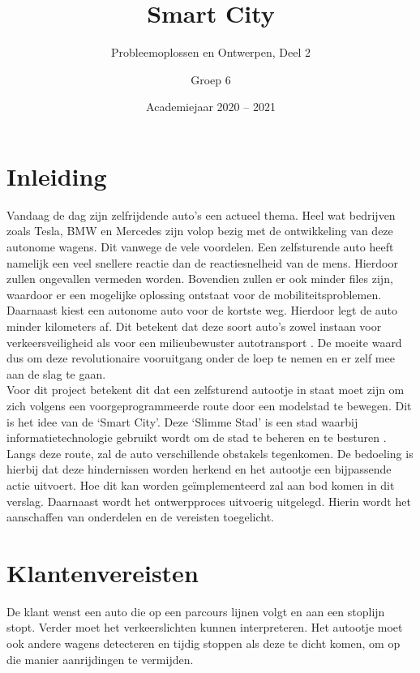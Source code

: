 \documentclass[a4paper,twoside,kulak]{kulakreport} %
\title{Smart City}
\subtitle{Probleemoplossen en Ontwerpen, Deel 2}
\author{Groep 6}
\institute {Aaron Vandenberghe, Dieter Demuynck, Jolien Barbier\\  
	Mathis Bossuyt, Rani Jans en Sarah De Meester \\~\\ 
	o.l.v. Benjamin Maveau Kevin Truyaert en Martijn Boussé}
\date{Academiejaar 2020 -- 2021}
\begin{document}

\titlepage 
\tableofcontents
\renewcommand\thesection{\arabic{section}}
\renewcommand\thesubsection{\thesection.\arabic{subsection}}
\newpage
\section*{Inleiding}\label{Inleiding}
Vandaag de dag zijn zelfrijdende auto's een actueel thema. Heel wat bedrijven zoals Tesla, BMW en Mercedes zijn volop bezig met de ontwikkeling van deze autonome wagens. Dit vanwege de vele voordelen. Een zelfsturende auto heeft namelijk een veel snellere reactie dan de reactiesnelheid van de mens. Hierdoor zullen ongevallen vermeden worden. Bovendien zullen er ook minder files zijn, waardoor er een mogelijke oplossing ontstaat voor de mobiliteitsproblemen. Daarnaast kiest een autonome auto voor de kortste weg. Hierdoor legt de auto minder kilometers af. Dit betekent dat deze soort auto's zowel instaan voor verkeersveiligheid als voor een milieubewuster autotransport \cite{AutonomeAutos1, AutonomeAutos2}. De moeite waard dus om deze revolutionaire vooruitgang onder de loep te nemen en er zelf mee aan de slag te gaan.\\
Voor dit project betekent dit dat een zelfsturend autootje in staat moet zijn om zich volgens een voorgeprogrammeerde route door een modelstad te bewegen. Dit is het idee van de `Smart City'. Deze `Slimme Stad' is een stad waarbij informatietechnologie gebruikt wordt om de stad te beheren en te besturen \cite{SmartCity}. Langs deze route, zal de auto verschillende obstakels tegenkomen. De bedoeling is hierbij dat deze hindernissen worden herkend en het autootje een bijpassende actie uitvoert. Hoe dit kan worden geïmplementeerd zal aan bod komen in dit verslag. Daarnaast wordt het ontwerpproces uitvoerig uitgelegd. Hierin wordt het aanschaffen van onderdelen en de vereisten toegelicht.


\section{Klantenvereisten} \label{Klantenvereisten}
De klant wenst een auto die op een parcours lijnen volgt en aan een stoplijn stopt. Verder moet het verkeerslichten kunnen interpreteren. Het autootje moet ook andere wagens detecteren en tijdig stoppen als deze te dicht komen, om op die manier aanrijdingen te vermijden.
\end{document}
